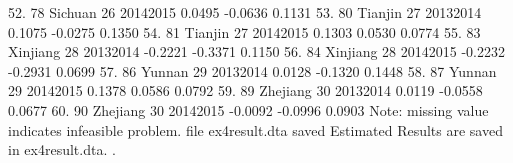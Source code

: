 52. {\VBAR}  78          Sichuan   26   2014{\tytilde}2015    0.0495   -0.0636   0.1131 {\VBAR}
53. {\VBAR}  80          Tianjin   27   2013{\tytilde}2014    0.1075   -0.0275   0.1350 {\VBAR}
54. {\VBAR}  81          Tianjin   27   2014{\tytilde}2015    0.1303    0.0530   0.0774 {\VBAR}
55. {\VBAR}  83         Xinjiang   28   2013{\tytilde}2014   -0.2221   -0.3371   0.1150 {\VBAR}
56. {\VBAR}  84         Xinjiang   28   2014{\tytilde}2015   -0.2232   -0.2931   0.0699 {\VBAR}
57. {\VBAR}  86           Yunnan   29   2013{\tytilde}2014    0.0128   -0.1320   0.1448 {\VBAR}
58. {\VBAR}  87           Yunnan   29   2014{\tytilde}2015    0.1378    0.0586   0.0792 {\VBAR}
59. {\VBAR}  89         Zhejiang   30   2013{\tytilde}2014    0.0119   -0.0558   0.0677 {\VBAR}
60. {\VBAR}  90         Zhejiang   30   2014{\tytilde}2015   -0.0092   -0.0996   0.0903 {\VBAR}
{\BLC}
Note: missing value indicates infeasible problem.
file ex4result.dta saved
{\smallskip}
Estimated Results are saved in ex4result.dta.
{\smallskip}
. 
